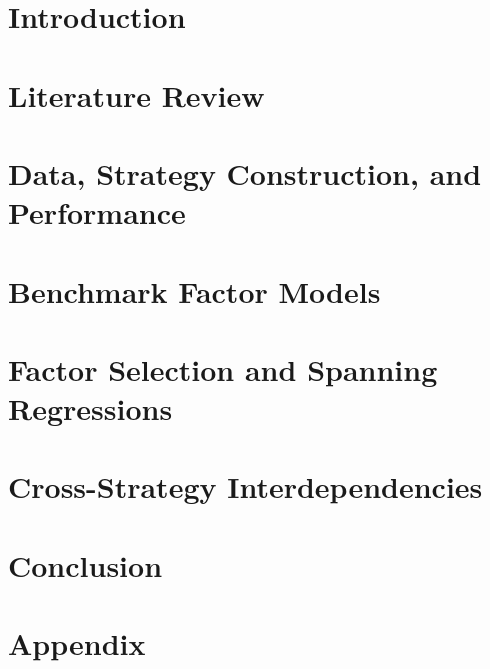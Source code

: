 \documentclass[12pt, oneside, letterpaper]{article}
\begin{document}


\clearpage
\section{Introduction}
\label{sec:introduction}


\section{Literature Review}
\label{sec:literature}


\section{Data, Strategy Construction, and Performance}
\label{sec:data}


\section{Benchmark Factor Models}
\label{sec:benchmarks}


\section{Factor Selection and Spanning Regressions}
\label{sec:factor_selection}


\section{Cross-Strategy Interdependencies}
\label{sec:interdependencies}


\section{Conclusion}
\label{sec:conclusion}


\clearpage
\begin{singlespace}

\end{singlespace}

\clearpage
\appendix
\section{Appendix}
\label{sec:appendix}

\end{document}
